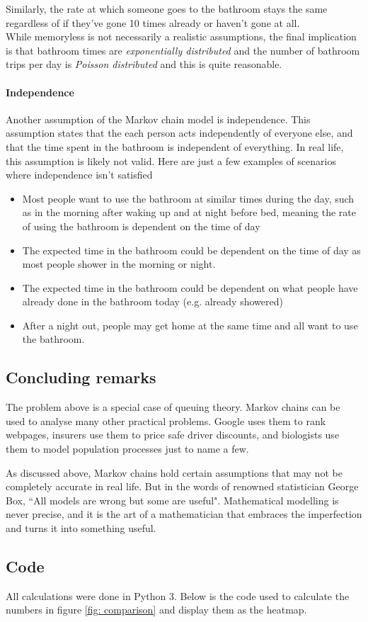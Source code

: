 Similarly, the rate at which someone goes to the bathroom stays the same regardless of if they've gone 10 times already or haven't gone at all.
\\

While memoryless is not necessarily a realistic assumptions, the final implication is that bathroom times are \textit{exponentially distributed} and the number of bathroom trips per day is \textit{Poisson distributed} and this is quite reasonable.

\paragraph{Independence}
Another assumption of the Markov chain model is independence. This assumption states that the each person acts independently of everyone else, and that the time spent in the bathroom is independent of everything. In real life, this assumption is likely not valid. Here are just a few examples of scenarios where independence isn't satisfied
\begin{itemize}
	\item Most people want to use the bathroom at similar times during the day, such as in the morning after waking up and at night before bed, meaning the rate of using the bathroom is dependent on the time of day
	\item The expected time in the bathroom could be dependent on the time of day as most people shower in the morning or night.
	\item The expected time in the bathroom could be dependent on what people have already done in the bathroom today (e.g. already showered)
	\item After a night out, people may get home at the same time and all want to use the bathroom.
\end{itemize}

\subsection*{Concluding remarks}
The problem above is a special case of queuing theory. Markov chains can be used to analyse many other practical problems. Google uses them to rank webpages, insurers use them to price safe driver discounts, and biologists use them to model population processes just to name a few.

As discussed above, Markov chains hold certain assumptions that may not be completely accurate in real life. But in the words of renowned statistician George Box, ``All models are wrong but some are useful". Mathematical modelling is never precise, and it is the art of a mathematician that embraces the imperfection and turns it into something useful.

\newpage
\subsection*{Code}
All calculations were done in Python 3. Below is the code used to calculate the numbers in figure \ref{fig: comparison} and display them as the heatmap.

